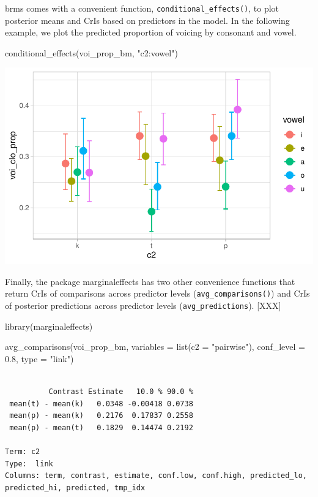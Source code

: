 \documentclass[
  authoryear,
  preprint,
  3p]{elsarticle}
\newenvironment{Shaded}{\begin{snugshade}}{\end{snugshade}}
\newcommand{\AttributeTok}[1]{\textcolor[rgb]{0.40,0.45,0.13}{#1}}
\newcommand{\FloatTok}[1]{\textcolor[rgb]{0.68,0.00,0.00}{#1}}
\newcommand{\FunctionTok}[1]{\textcolor[rgb]{0.28,0.35,0.67}{#1}}
\newcommand{\NormalTok}[1]{\textcolor[rgb]{0.00,0.23,0.31}{#1}}
\newcommand{\StringTok}[1]{\textcolor[rgb]{0.13,0.47,0.30}{#1}}
\begin{document}
brms comes with a convenient function, \texttt{conditional\_effects()},
to plot posterior means and CrIs based on predictors in the model. In
the following example, we plot the predicted proportion of voicing by
consonant and vowel.

\begin{Shaded}
\begin{Highlighting}[]
\FunctionTok{conditional\_effects}\NormalTok{(voi\_prop\_bm, }\StringTok{"c2:vowel"}\NormalTok{)}
\end{Highlighting}
\end{Shaded}

\includegraphics{manuscript_files/figure-pdf/voi-prop-bm-cond-1.pdf}

Finally, the package marginaleffects has two other convenience functions
that return CrIs of comparisons across predictor levels
(\texttt{avg\_comparisons()}) and CrIs of posterior predictions across
predictor levels (\texttt{avg\_predictions}). {[}XXX{]}

\begin{Shaded}
\begin{Highlighting}[]
\FunctionTok{library}\NormalTok{(marginaleffects)}

\FunctionTok{avg\_comparisons}\NormalTok{(voi\_prop\_bm, }\AttributeTok{variables =} \FunctionTok{list}\NormalTok{(}\AttributeTok{c2 =} \StringTok{"pairwise"}\NormalTok{), }\AttributeTok{conf\_level =} \FloatTok{0.8}\NormalTok{, }\AttributeTok{type =} \StringTok{"link"}\NormalTok{)}
\end{Highlighting}
\end{Shaded}

\begin{verbatim}

          Contrast Estimate   10.0 % 90.0 %
 mean(t) - mean(k)   0.0348 -0.00418 0.0738
 mean(p) - mean(k)   0.2176  0.17837 0.2558
 mean(p) - mean(t)   0.1829  0.14474 0.2192

Term: c2
Type:  link 
Columns: term, contrast, estimate, conf.low, conf.high, predicted_lo, predicted_hi, predicted, tmp_idx 
\end{verbatim}
\end{document}
